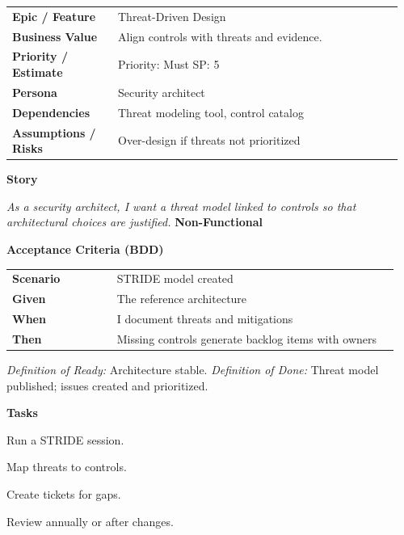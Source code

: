 \documentclass[11pt,letterpaper]{article}
\makeatletter
\newenvironment{kvtable}{%
  \begin{tabular}{@{}>{\bfseries\arraybackslash}p{0.26\linewidth} p{0.70\linewidth}@{}}
}{\end{tabular}}
\newenvironment{bdd}{%
  \begin{tabular}{@{}>{\bfseries\arraybackslash}p{0.26\linewidth} p{0.70\linewidth}@{}}
}{\end{tabular}}
\newcommand{\DoRDoD}[2]{%
  \vspace{0.35em}
  {\footnotesize\color{Muted}%
    \textit{Definition of Ready:} #1 \; \textbullet\;
    \textit{Definition of Done:} #2%
  }%
}
\newenvironment{storycard}[2]{%
  \begin{tcolorbox}[cloudcard, title={#1 --- #2}]%
}{\end{tcolorbox}}
\newcommand{\sectionlabel}[1]{\vspace{0.35em}\textbf{#1}\par}
\makeatother
\begin{document}
\begin{storycard}{CCS-16}{Ch. 16 — Secure Cloud Architecture}
\begin{kvtable}
Epic / Feature & Threat-Driven Design\\
Business Value & Align controls with threats and evidence.\\
Priority / Estimate & Priority: Must \quad SP: 5\\
Persona & Security architect\\
Dependencies & Threat modeling tool, control catalog\\
Assumptions / Risks & Over-design if threats not prioritized\\
\end{kvtable}
\sectionlabel{Story}
\textit{As a security architect, I want a threat model linked to controls so that architectural choices are justified.}
\sectionlabel{Non-Functional}\;
\sectionlabel{Acceptance Criteria (BDD)}
\begin{bdd}
Scenario & STRIDE model created\\
Given & The reference architecture\\
When & I document threats and mitigations\\
Then & Missing controls generate backlog items with owners\\
\end{bdd}
\DoRDoD{Architecture stable.}{Threat model published; issues created and prioritized.}
\sectionlabel{Tasks}
\begin{checklist}
\item Run a STRIDE session.
\item Map threats to controls.
\item Create tickets for gaps.
\item Review annually or after changes.
\end{checklist}
\end{storycard}
\end{document}
